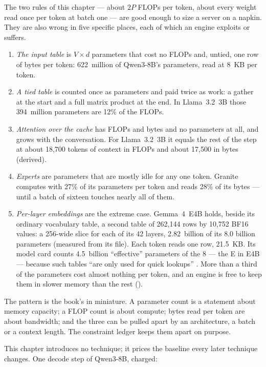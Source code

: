 The two rules of this chapter --- about $2P$ FLOPs per token, about every weight
read once per token at batch one --- are good enough to size a server on a
napkin. They are also wrong in five specific places, each of which an engine
exploits or suffers.

\begin{enumerate}
\item \emph{The input table} is $V \times d$ parameters that cost no FLOPs and,
untied, one row of bytes per token: 622~million of Qwen3-8B's parameters, read
at 8~KB per token.
\item \emph{A tied table} is counted once as parameters and paid twice as work:
a gather at the start and a full matrix product at the end. In Llama~3.2~3B
those 394~million parameters are 12\% of the FLOPs.
\item \emph{Attention over the cache} has FLOPs and bytes and no parameters at
all, and grows with the conversation. For Llama~3.2~3B it equals the rest of
the step at about 18,700 tokens of context in FLOPs and about 17,500 in bytes
(derived).
\item \emph{Experts} are parameters that are mostly idle for any one token.
Granite computes with 27\% of its parameters per token and reads 28\% of its
bytes --- until a batch of sixteen touches nearly all of them.
\item \emph{Per-layer embeddings} are the extreme case. Gemma~4~E4B holds, beside
its ordinary vocabulary table, a second table of 262,144 rows by 10,752 BF16
values: a 256-wide slice for each of its 42 layers, 2.82~billion of its 8.0
billion parameters (measured from its file). Each token reads one row,
21.5~KB. Its model card counts 4.5~billion ``effective'' parameters of the 8
--- the E in E4B --- because such tables ``are only used for quick lookups''
\cite{google2026gemma4}. More than a third of the parameters cost almost
nothing per token, and an engine is free to keep them in slower memory than the
rest ().
\end{enumerate}

\noindent The pattern is the book's in miniature. A parameter count is a
statement about memory capacity; a FLOP count is about compute; bytes read per
token are about bandwidth; and the three can be pulled apart by an
architecture, a batch or a context length. The constraint ledger keeps them
apart on purpose.

\LedgerSection

This chapter introduces no technique; it prices the baseline every later
technique changes. One decode step of Qwen3-8B, charged:


